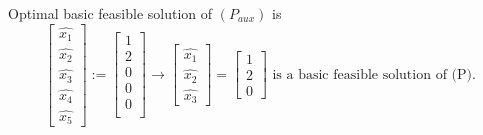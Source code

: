 Optimal basic feasible solution of $ (P_{aux}) $ is
\[ 
    \begin{bmatrix}
        \hat{x_1}\\
        \hat{x_2}\\
        \hat{x_3}\\
        \hat{x_4}\\
        \hat{x_5}
    \end{bmatrix}
    :=
    \begin{bmatrix}
        1\\
        2\\
        0\\
        0\\
        0\\
    \end{bmatrix}
    \rightarrow
    \begin{bmatrix}
        \hat{x_1}\\
        \hat{x_2}\\
        \hat{x_3}
    \end{bmatrix}
    =
    \begin{bmatrix}
        1\\
        2\\
        0
    \end{bmatrix}
    \text{ is a basic feasible solution of (P).}
\]

